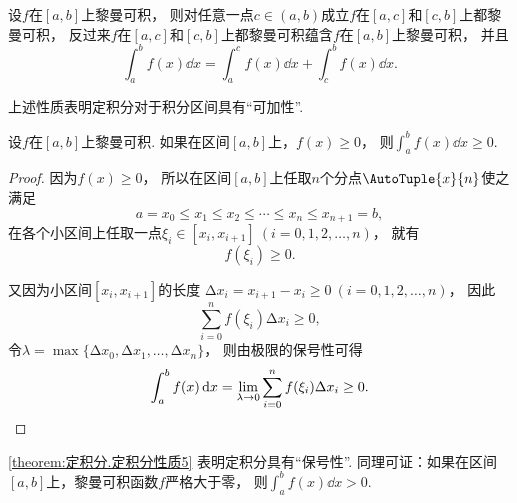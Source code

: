 \begin{property}\label{theorem:定积分.定积分性质3}
设\(f\)在\([a,b]\)上黎曼可积，
则对任意一点\(c\in(a,b)\)成立\(f\)在\([a,c]\)和\([c,b]\)上都黎曼可积，
反过来\(f\)在\([a,c]\)和\([c,b]\)上都黎曼可积蕴含\(f\)在\([a,b]\)上黎曼可积，
并且\begin{equation}
	\int_a^b f(x) \dd{x}
	= \int_a^c f(x) \dd{x}
	+ \int_c^b f(x) \dd{x}.
\end{equation}
\end{property}
上述性质表明定积分对于积分区间具有“可加性”.


\begin{property}\label{theorem:定积分.定积分性质5}
设\(f\)在\([a,b]\)上黎曼可积.
如果在区间\([a,b]\)上，\(f(x) \geq 0\)，
则\(\int_a^b f(x) \dd{x} \geq 0\).
\begin{proof}
因为\(f(x) \geq 0\)，
所以在区间\([a,b]\)上任取\(n\)个分点\(\AutoTuple{x}{n}\)使之满足\[
	a = x_0 \leq x_1 \leq x_2 \leq \dotsb \leq x_n \leq x_{n+1} = b,
\]
在各个小区间上任取一点\(\xi_i\in[x_i,x_{i+1}]\ (i=0,1,2,\dotsc,n)\)，
就有\[
	f(\xi_i)\geq0.
\]

又因为小区间\([x_i,x_{i+1}]\)的长度
\(\increment x_i = x_{i+1}-x_i \geq 0\ (i=0,1,2,\dotsc,n)\)，
因此\[
	\sum_{i=0}^n f(\xi_i) \increment x_i \geq 0,
\]
令\(\lambda = \max\{\increment x_0, \increment x_1, \dotsc, \increment x_n\}\)，
则由极限的保号性可得\[
	\int_a^b f(x) \dd{x}
	= \lim_{\lambda\to0} \sum_{i=0}^n f(\xi_i) \Delta x_i \geq 0.
	\qedhere
\]
\end{proof}
\end{property}
\begin{remark}
\cref{theorem:定积分.定积分性质5} 表明定积分具有“保号性”.
同理可证：如果在区间\([a,b]\)上，黎曼可积函数\(f\)严格大于零，
则\(\int_a^b f(x) \dd{x} > 0\).
\end{remark}


